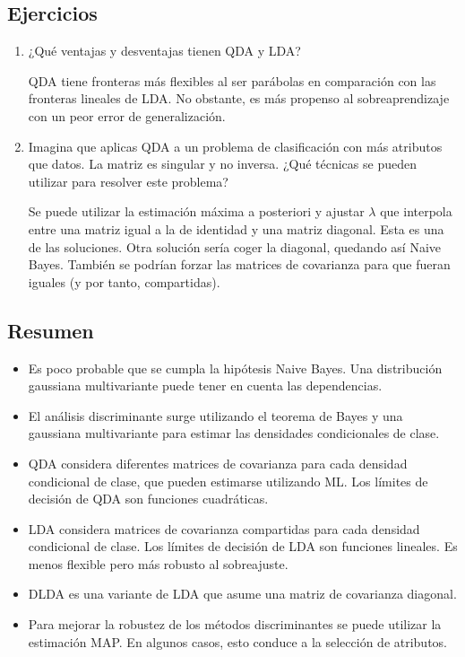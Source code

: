 \subsection{Ejercicios}
\begin{enumerate}
\item ¿Qué ventajas y desventajas tienen QDA y LDA?

QDA tiene fronteras más flexibles al ser parábolas en comparación con las fronteras lineales de LDA. No obstante, es más propenso al sobreaprendizaje con un peor error de generalización.

\item Imagina que aplicas QDA a un problema de clasificación con más atributos que datos. La matriz es singular y no inversa. ¿Qué técnicas se pueden utilizar para resolver este problema?

Se puede utilizar la estimación máxima a posteriori y ajustar $\lambda$ que interpola entre una matriz igual a la de identidad y una matriz diagonal. Esta es una de las soluciones. Otra solución sería coger la diagonal, quedando así Naive Bayes. También se podrían forzar las matrices de covarianza para que fueran iguales (y por tanto, compartidas).
\end{enumerate}

\subsection{Resumen}
\begin{itemize}
\item Es poco probable que se cumpla la hipótesis Naive Bayes. Una distribución gaussiana multivariante puede tener en cuenta las dependencias.
\item El análisis discriminante surge utilizando el teorema de Bayes y una gaussiana multivariante para estimar las densidades condicionales de clase.
\item QDA considera diferentes matrices de covarianza para cada densidad condicional de clase, que pueden estimarse utilizando ML. Los límites de decisión de QDA son funciones cuadráticas.
\item LDA considera matrices de covarianza compartidas para cada densidad condicional de clase. Los límites de decisión de LDA son funciones lineales. Es menos flexible pero más robusto al sobreajuste.
\item DLDA es una variante de LDA que asume una matriz de covarianza diagonal.
\item Para mejorar la robustez de los métodos discriminantes se puede utilizar la estimación MAP. En algunos casos, esto conduce a la selección de atributos.
\end{itemize}

